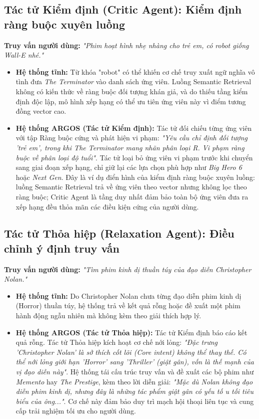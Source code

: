 \subsection{Tác tử Kiểm định (Critic Agent): Kiểm định ràng buộc xuyên luồng}
\textbf{Truy vấn người dùng:} \textit{"Phim hoạt hình nhẹ nhàng cho trẻ em, có robot giống Wall-E nhé."}
\begin{itemize}
    \item \textbf{Hệ thống tĩnh:} Từ khóa "robot" có thể khiến cơ chế truy xuất ngữ nghĩa vô tình đưa \textit{The Terminator} vào danh sách ứng viên. Luồng Semantic Retrieval không có kiến thức về ràng buộc đối tượng khán giả, và do thiếu tầng kiểm định độc lập, mô hình xếp hạng có thể ưu tiên ứng viên này vì điểm tương đồng vector cao.
    \item \textbf{Hệ thống ARGOS (Tác tử Kiểm định):} Tác tử đối chiếu từng ứng viên với tập Ràng buộc cứng và phát hiện vi phạm: \textit{"Yêu cầu chỉ định đối tượng 'trẻ em', trong khi The Terminator mang nhãn phân loại R. Vi phạm ràng buộc về phân loại độ tuổi"}. Tác tử loại bỏ ứng viên vi phạm trước khi chuyển sang giai đoạn xếp hạng, chỉ giữ lại các lựa chọn phù hợp như \textit{Big Hero 6} hoặc \textit{Next Gen}. Đây là ví dụ điển hình của kiểm định ràng buộc xuyên luồng: luồng Semantic Retrieval trả về ứng viên theo vector nhưng không lọc theo ràng buộc; Critic Agent là tầng duy nhất đảm bảo toàn bộ ứng viên đưa ra xếp hạng đều thỏa mãn các điều kiện cứng của người dùng.
\end{itemize}

\subsection{Tác tử Thỏa hiệp (Relaxation Agent): Điều chỉnh ý định truy vấn}
\textbf{Truy vấn người dùng:} \textit{"Tìm phim kinh dị thuần túy của đạo diễn Christopher Nolan."}
\begin{itemize}
    \item \textbf{Hệ thống tĩnh:} Do Christopher Nolan chưa từng đạo diễn phim kinh dị (Horror) thuần túy, hệ thống trả về kết quả rỗng hoặc đề xuất một phim hành động ngẫu nhiên mà không kèm theo giải thích hợp lý.
    \item \textbf{Hệ thống ARGOS (Tác tử Thỏa hiệp):} Tác tử Kiểm định báo cáo kết quả rỗng. Tác tử Thỏa hiệp kích hoạt cơ chế nới lỏng: \textit{"Đặc trưng 'Christopher Nolan' là sở thích cốt lõi (Core intent) không thể thay thế. Có thể nới lỏng giới hạn 'Horror' sang 'Thriller' (giật gân), vốn là thế mạnh của vị đạo diễn này"}. Hệ thống tái cấu trúc truy vấn và đề xuất các bộ phim như \textit{Memento} hay \textit{The Prestige}, kèm theo lời diễn giải: \textit{"Mặc dù Nolan không đạo diễn phim kinh dị, nhưng đây là những tác phẩm giật gân có yếu tố u tối tiêu biểu của ông..."}. Cơ chế này đảm bảo duy trì mạch hội thoại liên tục và cung cấp trải nghiệm tối ưu cho người dùng.
\end{itemize}

